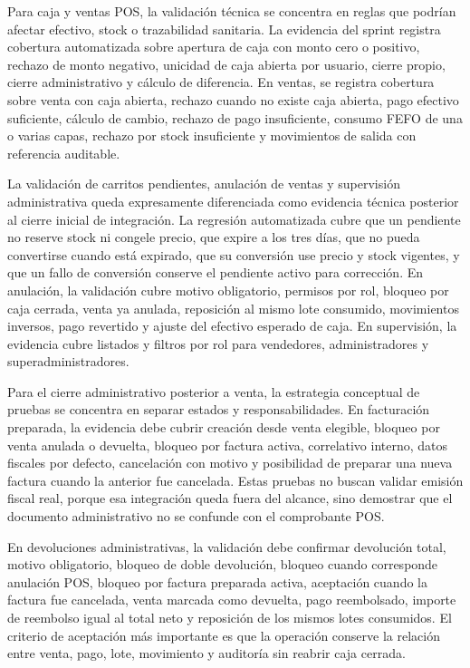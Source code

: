 Para caja y ventas POS, la validación técnica se concentra en reglas que podrían afectar efectivo, stock o trazabilidad sanitaria. La evidencia del sprint registra cobertura automatizada sobre apertura de caja con monto cero o positivo, rechazo de monto negativo, unicidad de caja abierta por usuario, cierre propio, cierre administrativo y cálculo de diferencia. En ventas, se registra cobertura sobre venta con caja abierta, rechazo cuando no existe caja abierta, pago efectivo suficiente, cálculo de cambio, rechazo de pago insuficiente, consumo FEFO de una o varias capas, rechazo por stock insuficiente y movimientos de salida con referencia auditable.

La validación de carritos pendientes, anulación de ventas y supervisión administrativa queda expresamente diferenciada como evidencia técnica posterior al cierre inicial de integración. La regresión automatizada cubre que un pendiente no reserve stock ni congele precio, que expire a los tres días, que no pueda convertirse cuando está expirado, que su conversión use precio y stock vigentes, y que un fallo de conversión conserve el pendiente activo para corrección. En anulación, la validación cubre motivo obligatorio, permisos por rol, bloqueo por caja cerrada, venta ya anulada, reposición al mismo lote consumido, movimientos inversos, pago revertido y ajuste del efectivo esperado de caja. En supervisión, la evidencia cubre listados y filtros por rol para vendedores, administradores y superadministradores.

Para el cierre administrativo posterior a venta, la estrategia conceptual de pruebas se concentra en separar estados y responsabilidades. En facturación preparada, la evidencia debe cubrir creación desde venta elegible, bloqueo por venta anulada o devuelta, bloqueo por factura activa, correlativo interno, datos fiscales por defecto, cancelación con motivo y posibilidad de preparar una nueva factura cuando la anterior fue cancelada. Estas pruebas no buscan validar emisión fiscal real, porque esa integración queda fuera del alcance, sino demostrar que el documento administrativo no se confunde con el comprobante POS.

En devoluciones administrativas, la validación debe confirmar devolución total, motivo obligatorio, bloqueo de doble devolución, bloqueo cuando corresponde anulación POS, bloqueo por factura preparada activa, aceptación cuando la factura fue cancelada, venta marcada como devuelta, pago reembolsado, importe de reembolso igual al total neto y reposición de los mismos lotes consumidos. El criterio de aceptación más importante es que la operación conserve la relación entre venta, pago, lote, movimiento y auditoría sin reabrir caja cerrada.


